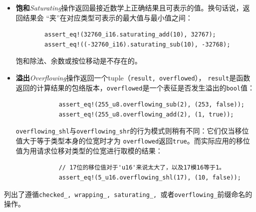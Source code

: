 \begin{itemize}
    \item \textbf{饱和}\textit{Saturating}操作返回最接近数学上正确结果且可表示的值。换句话说，返回结果会
        “夹”在对应类型可表示的最大值与最小值之间：
        \begin{verbatim}
        assert_eq!(32760_i16.saturating_add(10), 32767);
        assert_eq!((-32760_i16).saturating_sub(10), -32768);
        \end{verbatim}

        \smallskip
        饱和除法、余数或按位移动是不存在的。

    \item \textbf{溢出}\textit{Overflowing}操作返回一个tuple（\texttt{result, overflowed}），
        \texttt{result}是函数返回的计算结果的包络版本，\texttt{overflowed}是一个表征是否发生溢出的\texttt{bool}值：
        \begin{verbatim}
            assert_eq!(255_u8.overflowing_sub(2), (253, false));
            assert_eq!(255_u8.overflowing_add(2), (1, true));
        \end{verbatim}

        \smallskip
        \texttt{overflowing\_shl}与\texttt{overflowing\_shr}的行为模式则稍有不同：它们仅当移位值大于等于类型本身的位宽时才为
        \texttt{overflowed}返回\texttt{true}。而实际应用的移位值为用请求位移对类型的位宽进行取模的结果：
        \begin{verbatim}
            // 17位的移位值对于'u16'来说太大了，以及17模16等于1。
            assert_eq!(5_u16.overflowing_shl(17), (10, false));
        \end{verbatim}
\end{itemize}

\smallskip
{} 列出了遵循\texttt{checked\_, wrapping\_, saturating\_, }或者\texttt{overflowing\_}前缀命名的操作。

